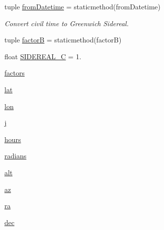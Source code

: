 \begin{DoxyCompactItemize}
\item 
tuple \hyperlink{namespaceamonpy_1_1sim_1_1sidereal_a3ad086c7aee5c5d5a6838ad7da5716e3}{from\-Datetime} = staticmethod(from\-Datetime)
\begin{DoxyCompactList}\small\item\em Convert civil time to Greenwich Sidereal. \end{DoxyCompactList}\item 
tuple \hyperlink{namespaceamonpy_1_1sim_1_1sidereal_aae0094a33936985d23752c0b42ea411f}{factor\-B} = staticmethod(factor\-B)
\item 
float \hyperlink{namespaceamonpy_1_1sim_1_1sidereal_a07bd4ddef1a220bfe344b9dda000fe0d}{S\-I\-D\-E\-R\-E\-A\-L\-\_\-\-C} = 1.
\item 
\hyperlink{namespaceamonpy_1_1sim_1_1sidereal_ab2edf7a627829f85f34e74fcdfe9cab3}{factors}
\item 
\hyperlink{namespaceamonpy_1_1sim_1_1sidereal_ac080650ce6d42cba0dd39366ed428779}{lat}
\item 
\hyperlink{namespaceamonpy_1_1sim_1_1sidereal_acd876ff43fec30cffbf0b1df441599d0}{lon}
\item 
\hyperlink{namespaceamonpy_1_1sim_1_1sidereal_acada5fbb9f626863280f6d2ed180cae0}{j}
\item 
\hyperlink{namespaceamonpy_1_1sim_1_1sidereal_a8f427c645843461ab5c9c698fa37f43c}{hours}
\item 
\hyperlink{namespaceamonpy_1_1sim_1_1sidereal_a821964057b74cb5a406284766eb22f18}{radians}
\item 
\hyperlink{namespaceamonpy_1_1sim_1_1sidereal_a8d228619aefc2000e3fee66d566f31e0}{alt}
\item 
\hyperlink{namespaceamonpy_1_1sim_1_1sidereal_a15578b81a6c550e6e65a8aca92d26205}{az}
\item 
\hyperlink{namespaceamonpy_1_1sim_1_1sidereal_ab0d219129e8288dbd1df5b48472a7ac7}{ra}
\item 
\hyperlink{namespaceamonpy_1_1sim_1_1sidereal_afecc68b3348d79c934a33ea9918e68ff}{dec}
\end{DoxyCompactItemize}


